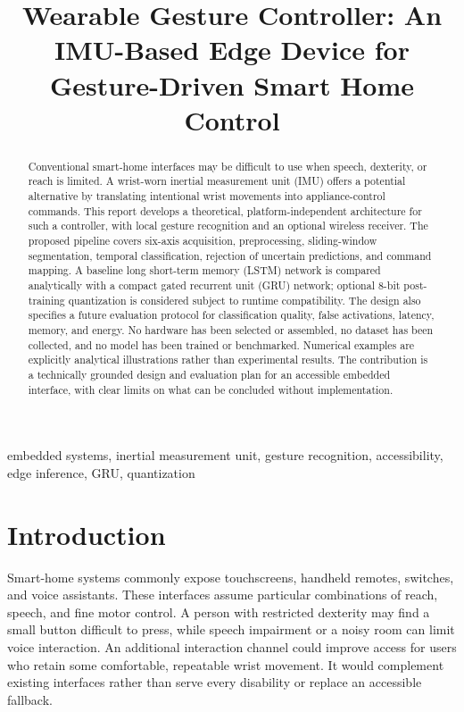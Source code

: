\documentclass[conference]{IEEEtran}
\begin{document}
\title{Wearable Gesture Controller: An IMU-Based Edge Device for Gesture-Driven Smart Home Control}
\author{
}
\maketitle

\begin{abstract}
Conventional smart-home interfaces may be difficult to use when speech, dexterity, or reach is limited. A wrist-worn inertial measurement unit (IMU) offers a potential alternative by translating intentional wrist movements into appliance-control commands. This report develops a theoretical, platform-independent architecture for such a controller, with local gesture recognition and an optional wireless receiver. The proposed pipeline covers six-axis acquisition, preprocessing, sliding-window segmentation, temporal classification, rejection of uncertain predictions, and command mapping. A baseline long short-term memory (LSTM) network is compared analytically with a compact gated recurrent unit (GRU) network; optional 8-bit post-training quantization is considered subject to runtime compatibility. The design also specifies a future evaluation protocol for classification quality, false activations, latency, memory, and energy. No hardware has been selected or assembled, no dataset has been collected, and no model has been trained or benchmarked. Numerical examples are explicitly analytical illustrations rather than experimental results. The contribution is a technically grounded design and evaluation plan for an accessible embedded interface, with clear limits on what can be concluded without implementation.
\end{abstract}

\begin{IEEEkeywords}
embedded systems, inertial measurement unit, gesture recognition, accessibility, edge inference, GRU, quantization
\end{IEEEkeywords}

\section{Introduction}
Smart-home systems commonly expose touchscreens, handheld remotes, switches, and voice assistants. These interfaces assume particular combinations of reach, speech, and fine motor control. A person with restricted dexterity may find a small button difficult to press, while speech impairment or a noisy room can limit voice interaction. An additional interaction channel could improve access for users who retain some comfortable, repeatable wrist movement. It would complement existing interfaces rather than serve every disability or replace an accessible fallback.
\end{document}
